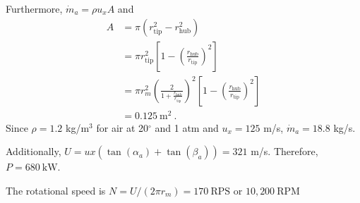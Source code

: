 \documentclass[12pt]{article}
\begin{document}
\begin{enumerate}[label=(\alph*)]
			Furthermore, $\dot{m}_a=\rho u_x A$ and
			\begin{equation}
				\label{EQ_AREA}
				\begin{aligned}
					A &= \pi(r_\mathrm{tip}^2-r_\mathrm{hub}^2)\\
					&=\pi r_\mathrm{tip}^2\left[1-\left(\frac{r_\mathrm{hub}}{r_\mathrm{tip}}\right)^2\right]\\
					&=\pi r_m^2 \left(\frac{2}{1+\frac{r_\mathrm{hub}}{r_\mathrm{tip}}}\right)^2\left[1-\left(\frac{r_\mathrm{hub}}{r_\mathrm{tip}}\right)^2\right]\\
					&=0.125\ \mathrm{m^2}\ .
				\end{aligned}
			\end{equation}
			Since $\rho=1.2$ kg/m$^3$ for air at 20$^\circ$ and 1 atm and $u_x=125$ m/s, $\dot{m}_a=18.8$ kg/s. 
			
			Additionally,  $U=ux(\tan(\alpha_a)+\tan(\beta_a))=321$ m/s. Therefore, $\boxed{P=680\ \mathrm{kW}}$. 
			
			The rotational speed is $N=U/(2\pi r_m)=\boxed{170\ \mathrm{RPS}}	$ or $\boxed{10,200\ \mathrm{RPM}}$	
		\end{enumerate}
\end{document}
